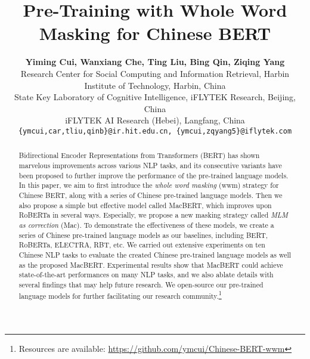 \documentclass[journal]{IEEEtran}
\begin{document}
\begin{CJK*}{UTF8}{gbsn}
\title{Pre-Training with Whole Word Masking for Chinese BERT}


\author{{\bf Yiming Cui, Wanxiang Che, Ting Liu, Bing Qin, Ziqing Yang}   \\ {Research Center for Social Computing and Information Retrieval, Harbin Institute of Technology, Harbin, China}\\
{State Key Laboratory of Cognitive Intelligence, iFLYTEK Research, Beijing, China}\\
{iFLYTEK AI Research (Hebei), Langfang, China} \\
{\tt \{ymcui,car,tliu,qinb\}@ir.hit.edu.cn, \tt\{ymcui,zqyang5\}@iflytek.com}\\  
}





















\maketitle

\begin{abstract}
Bidirectional Encoder Representations from Transformers (BERT) has shown marvelous improvements across various NLP tasks, and its consecutive variants have been proposed to further improve the performance of the pre-trained language models.
In this paper, we aim to first introduce the {\em whole word masking} (wwm) strategy for Chinese BERT, along with a series of Chinese pre-trained language models.
Then we also propose a simple but effective model called MacBERT, which improves upon RoBERTa in several ways.
Especially, we propose a new masking strategy called {\em MLM as correction} (Mac).
To demonstrate the effectiveness of these models, we create a series of Chinese pre-trained language models as our baselines, including BERT, RoBERTa, ELECTRA, RBT, etc.
We carried out extensive experiments on ten Chinese NLP tasks to evaluate the created Chinese pre-trained language models as well as the proposed MacBERT.
Experimental results show that MacBERT could achieve state-of-the-art performances on many NLP tasks, and we also ablate details with several findings that may help future research.
We open-source our pre-trained language models for further facilitating our research community.\footnote{Resources are available: \url{https://github.com/ymcui/Chinese-BERT-wwm}}
\end{abstract}


\end{CJK*}
\end{document}
